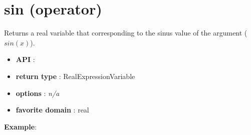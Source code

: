 \label{sin}
\hypertarget{sin}{}

\section{sin (operator)}\label{sin:sinoperator}\hypertarget{sin:sinoperator}{}
Returns a real variable that corresponding to the sinus value of the argument (\(sin(x)\)).

\begin{itemize}
	\item \textbf{API} : 
	\item \textbf{return type} : RealExpressionVariable
	\item \textbf{options} : \emph{n/a}
	\item \textbf{favorite domain} : real
\end{itemize}

\textbf{Example}:

